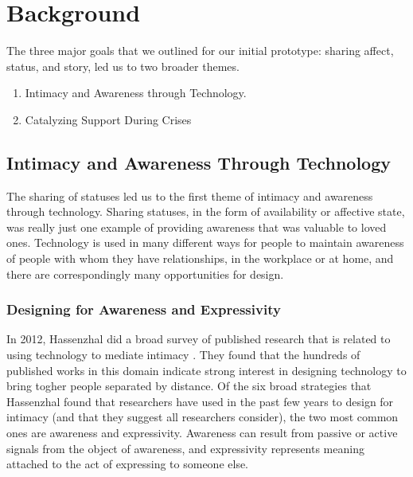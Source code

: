 \chapter{Background}
  The three major goals that we outlined for our initial prototype:
  sharing affect, status, and story, led us to two broader themes.
  \begin{enumerate}
  \item Intimacy and Awareness through Technology.
  \item Catalyzing Support During Crises
  \end{enumerate}

\section{Intimacy and Awareness Through Technology}
  The sharing of statuses led us to the first theme of
  intimacy and awareness through technology.
  Sharing statuses,
  in the form of availability or affective state,
  was really just one example of providing awareness that was valuable to loved ones.
  Technology is used in many different ways for people to maintain
  awareness of people with whom they have relationships,
  in the workplace or at home,
  and there are correspondingly many opportunities for design.

  \subsection{Designing for Awareness and Expressivity}
    In 2012, Hassenzhal did a broad survey of published research
    that is related to using technology to mediate intimacy
    \cite{hassenzhal12}.
    They found that the hundreds of published works in this domain indicate strong
    interest in designing technology to bring togher people separated by distance.
    Of the six broad strategies that Hassenzhal found
    that researchers have used in the past few years to design for intimacy
    (and that they suggest all researchers consider),
    the two most common ones are awareness and expressivity.
    Awareness can result from passive or active signals from
    the object of awareness,
    and expressivity represents meaning attached
    to the act of expressing to someone else.


